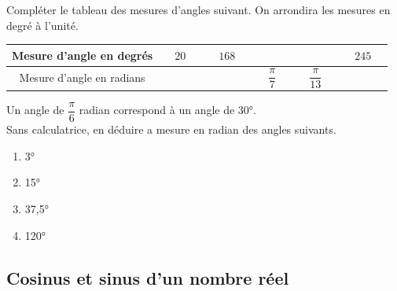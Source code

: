\documentclass[a4paper,11pt,exos]{nsi} %
\begin{document}
\exo{}
Compléter le tableau des mesures d'angles suivant. On arrondira les mesures en degré à l'unité.
\begin{center}
	\renewcommand{\arraystretch}{2.4}
	\begin{tabular}{|c|c|c|c|c|c|}
		\hline 
		Mesure d'angle en degrés & $\quad 20\quad $&$\quad 168\quad$ &$\quad \quad $&$\quad \quad$ &$\quad 245\quad$  \\ 
		\hline 
		Mesure d'angle en radians &  &  & $\quad\dfrac{\pi}{7}\quad$ & $\quad\dfrac{\pi}{13}\quad$ &  \\ 
		\hline 
	\end{tabular} 
\end{center}


\exo{}
Un angle de $\dfrac{\pi}{6}$ radian correspond à un angle de 30°.\\[.5em]
Sans calculatrice, en déduire a mesure en radian des angles suivants.
\begin{multicols}{4}
	\begin{enumerate}
		\item 	3°
		\item 	15°
		\item	37,5°
		\item	120°	
	\end{enumerate}
\end{multicols}

\subsection*{Cosinus et sinus d'un nombre réel}
\end{document}
